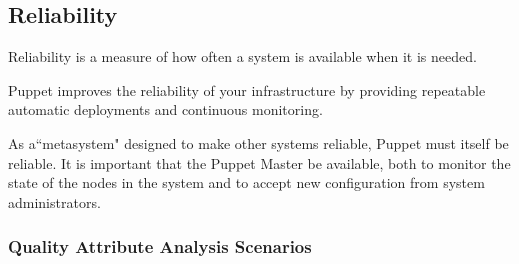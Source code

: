 \documentclass[a4paper]{article}
\begin{document}



%

\subsection{Reliability}


Reliability is a measure of how often a system is available when it is needed.

Puppet improves the reliability of your infrastructure by providing repeatable automatic deployments and continuous monitoring.

As a``metasystem" designed to make other systems reliable, Puppet must itself be reliable. It is important that the Puppet Master be available, both to monitor the state of the nodes in the system and to accept new configuration from system administrators.

\subsubsection{Quality Attribute Analysis Scenarios}
\end{document}

